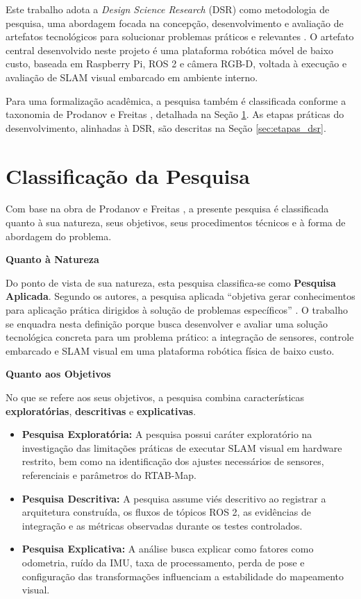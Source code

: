Este trabalho adota a \emph{Design Science Research} (DSR) como metodologia de pesquisa, uma abordagem focada na concepção, desenvolvimento e avaliação de artefatos tecnológicos para solucionar problemas práticos e relevantes \cite{hevner2004designscienceinformation, dresch2015distinctiveanalysiscase}. O artefato central desenvolvido neste projeto é uma plataforma robótica móvel de baixo custo, baseada em Raspberry Pi, ROS 2 e câmera RGB-D, voltada à execução e avaliação de SLAM visual embarcado em ambiente interno.

Para uma formalização acadêmica, a pesquisa também é classificada conforme a taxonomia de Prodanov e Freitas \cite{prodanov2012metodologiatrabalhocientifico}, detalhada na Seção \ref{sec:Class_Pesquisa}. As etapas práticas do desenvolvimento, alinhadas à DSR, são descritas na Seção \ref{sec:etapas_dsr}.

\section{Classificação da Pesquisa}\label{sec:Class_Pesquisa}

Com base na obra de Prodanov e Freitas \cite{prodanov2012metodologiatrabalhocientifico}, a presente pesquisa é classificada quanto à sua natureza, seus objetivos, seus procedimentos técnicos e à forma de abordagem do problema.

\noindent\textbf{Quanto à Natureza}\par
Do ponto de vista de sua natureza, esta pesquisa classifica-se como \textbf{Pesquisa Aplicada}. Segundo os autores, a pesquisa aplicada ``objetiva gerar conhecimentos para aplicação prática dirigidos à solução de problemas específicos'' \cite[p. 51]{prodanov2012metodologiatrabalhocientifico}. O trabalho se enquadra nesta definição porque busca desenvolver e avaliar uma solução tecnológica concreta para um problema prático: a integração de sensores, controle embarcado e SLAM visual em uma plataforma robótica física de baixo custo.

\noindent\textbf{Quanto aos Objetivos}\par
No que se refere aos seus objetivos, a pesquisa combina características \textbf{exploratórias}, \textbf{descritivas} e \textbf{explicativas}.
\begin{itemize}
    \item \textbf{Pesquisa Exploratória:} A pesquisa possui caráter exploratório na investigação das limitações práticas de executar SLAM visual em hardware restrito, bem como na identificação dos ajustes necessários de sensores, referenciais e parâmetros do RTAB-Map.
    \item \textbf{Pesquisa Descritiva:} A pesquisa assume viés descritivo ao registrar a arquitetura construída, os fluxos de tópicos ROS 2, as evidências de integração e as métricas observadas durante os testes controlados.
    \item \textbf{Pesquisa Explicativa:} A análise busca explicar como fatores como odometria, ruído da IMU, taxa de processamento, perda de pose e configuração das transformações influenciam a estabilidade do mapeamento visual.
\end{itemize}

